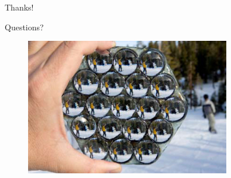 \begin{frame}{Thanks!}
\begin{center}
\Large{Questions?}
\end{center}
\begin{figure}[h!]
\centering
\includegraphics[width=0.8\textwidth]{./Images/lf-camera.jpg}
\end{figure}
\end{frame}

